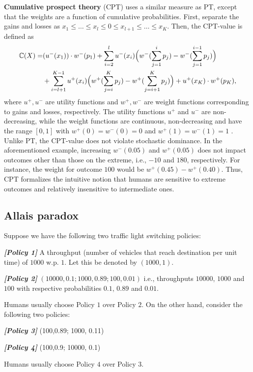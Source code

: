 \textbf{Cumulative prospect theory} (CPT) \cite{tversky1992advances} uses a similar measure as PT, except that the weights are a function of cumulative probabilities. First, separate the gains and losses as 
$x_1\le \ldots \le x_l \le 0 \le x_{l+1} \le \ldots \le x_K$. Then, the CPT-value is defined as 
\begin{align*}
\mathbb{C}(X) = &(u^-(x_1))\cdot w^-(p_1) 
+\sum_{i=2}^l u^-(x_i) \Big(w^-(\sum_{j=1}^i p_j) - w^-(\sum_{j=1}^{i-1} p_j)\Big) 
\\&
 + \sum_{i=l+1}^{K-1} u^+(x_i) \Big(w^+(\sum_{j=i}^K p_j) - w^+(\sum_{j=i+1}^K p_j) \Big)
 + u^+(x_K)\cdot w^+(p_K), 
\end{align*} 
where $u^+, u^-$ are utility functions and $w^+, w^-$ are weight functions corresponding to gains and losses, respectively. The utility functions $u^+$ and $u^-$ are non-decreasing, while the weight functions are continuous, non-decreasing and have the range $[0,1]$ with $w^+(0)=w^-(0)=0$ and $w^+(1)=w^-(1)=1$ . 
Unlike PT, the CPT-value does not violate stochastic dominance. In the aforementioned example, increasing $w^-(0.05)$ and $w^+(0.05)$ does not impact outcomes other than those on the extreme, i.e., $-10$ and $180$, respectively. For instance, the weight for outcome $100$ would be $w^+(0.45) - w^+(0.40)$. Thus, CPT formalizes the intuitive notion that humans are sensitive to extreme outcomes and relatively insensitive to intermediate ones.

\subsection*{Allais paradox}
Suppose we have the following two traffic light switching policies:

\textbf{\textit{[Policy 1]}} A throughput (number of vehicles that reach destination per unit time) of $1000$  w.p. $1$. Let this be denoted by $(1000,1)$.

\textbf{\textit{[Policy 2]}}  $(10000, 0.1; 1000,0.89; 100, 0.01)$ i.e., throughputs $10000$, $1000$ and $100$ with respective probabilities $0.1$, $0.89$ and $0.01$.

Humans usually choose Policy $1$ over Policy $2$. On the other hand, consider the following two policies:

\textbf{\textit{[Policy 3]}} (100,0.89; 1000, 0.11)

\textbf{\textit{[Policy 4]}} (100,0.9; 10000, 0.1)

Humans usually choose Policy $4$ over Policy $3$. 

